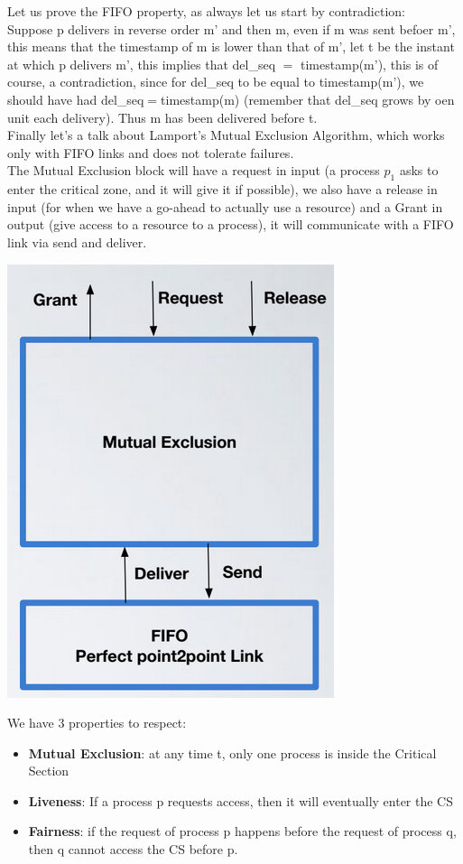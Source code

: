 \documentclass[11pt, a4paper]{article}
\begin{document}
Let us prove the FIFO property, as always let us start by contradiction:\\
Suppose p delivers in reverse order m' and then m, even if m was sent befoer m', this means that the timestamp of m is lower than that of m', let t be the instant at which p delivers m', this implies that del\_seq $=$ timestamp(m'), this is of course, a contradiction, since for del\_seq to be equal to timestamp(m'), we should have had del\_seq$=$timestamp(m) (remember that del\_seq grows by oen unit each delivery). Thus m has been delivered before t.\\
Finally let's a talk about Lamport's Mutual Exclusion Algorithm, which works only with FIFO links and does not tolerate failures.\\
The Mutual Exclusion block will have a request in input (a process $p_1$ asks to enter the critical zone, and it will give it if possible), we also have a release in input (for when we have a go-ahead to actually use a resource) and a Grant in output (give access to a resource to a process), it will communicate with a FIFO link via send and deliver.
\begin{center}
    \includegraphics[scale=0.5]{img/mutex/graph.png}
\end{center}
We have 3 properties to respect:
\begin{itemize}
\item \textbf{Mutual Exclusion}: at any time t, only one process is inside the Critical Section
\item \textbf{Liveness}: If a process p requests access, then it will eventually enter the CS
\item \textbf{Fairness}: if the request of process p happens before the request of process q, then q cannot access the CS before p.

\end{itemize}
\end{document}
